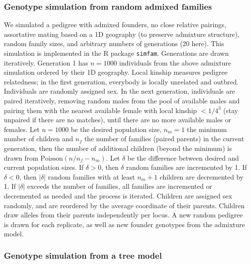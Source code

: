 \documentclass[11pt]{article}
\begin{document}
\subsubsection{Genotype simulation from random admixed families}

We simulated a pedigree with admixed founders, no close relative pairings, assortative mating based on a 1D geography (to preserve admixture structure), random family sizes, and arbitrary numbers of generations (20 here).
This simulation is implemented in the R package \texttt{simfam}.
Generations are drawn iteratively.
Generation 1 has $n=1000$ individuals from the above admixture simulation ordered by their 1D geography.
Local kinship measures pedigree relatedness; in the first generation, everybody is locally unrelated and outbred.
Individuals are randomly assigned sex.
In the next generation, individuals are paired iteratively, removing random males from the pool of available males and pairing them with the nearest available female with local kinship $< 1/4^3$ (stay unpaired if there are no matches), until there are no more available males or females.
Let $n=1000$ be the desired population size, $n_m=1$ the minimum number of children and $n_f$ the number of families (paired parents) in the current generation, then the number of additional children (beyond the minimum) is drawn from $\text{Poisson}(n/n_f - n_m)$.
Let $\delta$ be the difference between desired and current population sizes.
If $\delta > 0$, then $\delta$ random families are incremented by 1.
If $\delta < 0$, then $|\delta|$ random families with at least $n_m+1$ children are decremented by 1.
If $|\delta|$ exceeds the number of families, all families are incremented or decremented as needed and the process is iterated.
Children are assigned sex randomly, and are reordered by the average coordinate of their parents.
Children draw alleles from their parents independently per locus.
A new random pedigree is drawn for each replicate, as well as new founder genotypes from the admixture model.

\subsubsection{Genotype simulation from a tree model}
\end{document}
